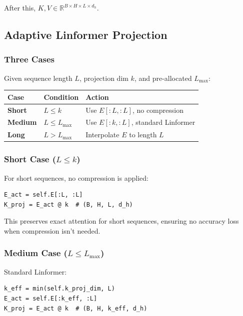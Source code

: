 After this, $K, V \in \mathbb{R}^{B \times H \times L \times d_h}$.

\subsection{Adaptive Linformer Projection}

\subsubsection{Three Cases}

Given sequence length $L$, projection dim $k$, and pre-allocated $L_\text{max}$:

\begin{table}[H]
\centering
\small
\begin{tabular}{lll}
\toprule
\textbf{Case} & \textbf{Condition} & \textbf{Action} \\
\midrule
\textbf{Short} & $L \leq k$ & Use $E[:L, :L]$, no compression \\
\textbf{Medium} & $L \leq L_\text{max}$ & Use $E[:k, :L]$, standard Linformer \\
\textbf{Long} & $L > L_\text{max}$ & Interpolate $E$ to length $L$ \\
\bottomrule
\end{tabular}
\end{table}

\subsubsection{Short Case ($L \leq k$)}

For short sequences, no compression is applied:

\begin{lstlisting}
E_act = self.E[:L, :L]
K_proj = E_act @ k  # (B, H, L, d_h)
\end{lstlisting}

This preserves exact attention for short sequences, ensuring no accuracy 
loss when compression isn't needed.

\subsubsection{Medium Case ($L \leq L_\text{max}$)}

Standard Linformer:

\begin{lstlisting}
k_eff = min(self.k_proj_dim, L)
E_act = self.E[:k_eff, :L]
K_proj = E_act @ k  # (B, H, k_eff, d_h)
\end{lstlisting}

